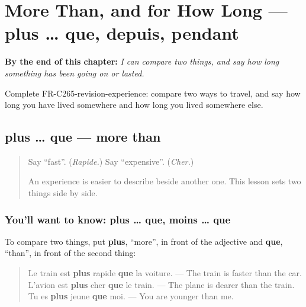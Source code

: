 
\chapter{More Than, and for How Long — plus … que, depuis, pendant}
\label{ch:fr-more-than-and-how-long}

\begin{chapteropening}
\textbf{By the end of this chapter:} \emph{I can compare two things, and say how long something has been going on or lasted.}

Complete FR-C265-revision-experience: compare two ways to travel, and say how long you have lived somewhere and how long you lived somewhere else.
\end{chapteropening}

\section[plus … que, moins … que]{plus … que — more than}

\label{lesson:FR-C265-plus-que}



\begin{quote}
Say \textquotedblleft{}fast\textquotedblright{}. (\emph{Rapide.}) Say \textquotedblleft{}expensive\textquotedblright{}. (\emph{Cher.})

An experience is easier to describe beside another one. This lesson sets two things side by side.
\end{quote}

\subsection*{You'll want to know: plus … que, moins … que}
To compare two things, put \textbf{plus}, \textquotedblleft{}more\textquotedblright{}, in front of the adjective and \textbf{que}, \textquotedblleft{}than\textquotedblright{}, in front of the second thing:

\begin{quote}
Le train est \textbf{plus} rapide \textbf{que} la voiture. — The train is faster than the car. L'avion est \textbf{plus} cher \textbf{que} le train. — The plane is dearer than the train. Tu es \textbf{plus} jeune \textbf{que} moi. — You are younger than me.
\end{quote}

